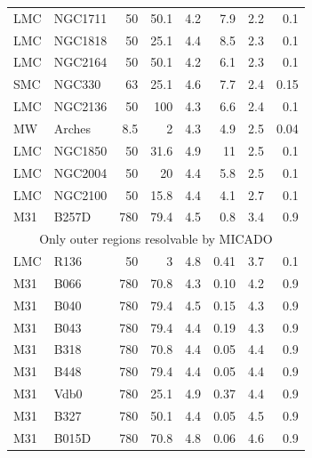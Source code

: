 \begin{table}
\begin{tabular}{l l r r r r r r}
        LMC    & NGC1711      & 50       & 50.1 & 4.2       & 7.9     & 2.2            & 0.1           \\
        LMC    & NGC1818      & 50       & 25.1 & 4.4       & 8.5     & 2.3            & 0.1           \\
        LMC    & NGC2164      & 50       & 50.1 & 4.2       & 6.1     & 2.3            & 0.1           \\
        SMC    & NGC330       & 63       & 25.1 & 4.6       & 7.7     & 2.4            & 0.15          \\
        LMC    & NGC2136      & 50       & 100  & 4.3       & 6.6     & 2.4            & 0.1           \\
        MW     & Arches       & 8.5      & 2    & 4.3       & 4.9     & 2.5            & 0.04          \\
        LMC    & NGC1850      & 50       & 31.6 & 4.9       & 11      & 2.5            & 0.1           \\
        LMC    & NGC2004      & 50       & 20   & 4.4       & 5.8     & 2.5            & 0.1           \\
        LMC    & NGC2100      & 50       & 15.8 & 4.4       & 4.1     & 2.7            & 0.1           \\
        M31    & B257D        & 780      & 79.4 & 4.5       & 0.8     & 3.4            & 0.9           \\
        \hline
        \multicolumn{8}{c}{Only outer regions resolvable by MICADO}                                    \\
        \hline
        LMC    & R136         & 50       & 3    & 4.8       & 0.41    & 3.7            & 0.1           \\
        M31    & B066         & 780      & 70.8 & 4.3       & 0.10    & 4.2            & 0.9           \\
        M31    & B040         & 780      & 79.4 & 4.5       & 0.15    & 4.3            & 0.9           \\
        M31    & B043         & 780      & 79.4 & 4.4       & 0.19    & 4.3            & 0.9           \\
        M31    & B318         & 780      & 70.8 & 4.4       & 0.05    & 4.4            & 0.9           \\
        M31    & B448         & 780      & 79.4 & 4.4       & 0.05    & 4.4            & 0.9           \\
        M31    & Vdb0         & 780      & 25.1 & 4.9       & 0.37    & 4.4            & 0.9           \\
        M31    & B327         & 780      & 50.1 & 4.4       & 0.05    & 4.5            & 0.9           \\
        M31    & B015D        & 780      & 70.8 & 4.8       & 0.06    & 4.6            & 0.9           \\
        \hline
    \end{tabular}
\end{table}



